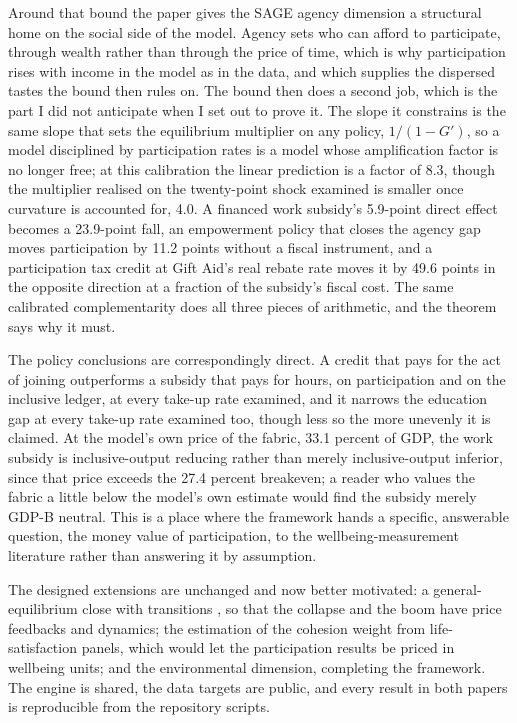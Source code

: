 \documentclass[11pt]{article}
\begin{document}
Around that bound the paper gives the SAGE agency dimension a structural home on the social side of the model. Agency sets who can afford to participate, through wealth rather than through the price of time, which is why participation rises with income in the model as in the data, and which supplies the dispersed tastes the bound then rules on. The bound then does a second job, which is the part I did not anticipate when I set out to prove it. The slope it constrains is the same slope that sets the equilibrium multiplier on any policy, $1/(1-G')$, so a model disciplined by participation rates is a model whose amplification factor is no longer free; at this calibration the linear prediction is a factor of 8.3, though the multiplier realised on the twenty-point shock examined is smaller once curvature is accounted for, 4.0. A financed work subsidy's 5.9-point direct effect becomes a 23.9-point fall, an empowerment policy that closes the agency gap moves participation by 11.2 points without a fiscal instrument, and a participation tax credit at Gift Aid's real rebate rate moves it by 49.6 points in the opposite direction at a fraction of the subsidy's fiscal cost. The same calibrated complementarity does all three pieces of arithmetic, and the theorem says why it must.

The policy conclusions are correspondingly direct. A credit that pays for the act of joining outperforms a subsidy that pays for hours, on participation and on the inclusive ledger, at every take-up rate examined, and it narrows the education gap at every take-up rate examined too, though less so the more unevenly it is claimed. At the model's own price of the fabric, 33.1 percent of GDP, the work subsidy is inclusive-output reducing rather than merely inclusive-output inferior, since that price exceeds the 27.4 percent breakeven; a reader who values the fabric a little below the model's own estimate would find the subsidy merely GDP-B neutral. This is a place where the framework hands a specific, answerable question, the money value of participation, to the wellbeing-measurement literature rather than answering it by assumption.

The designed extensions are unchanged and now better motivated: a general-equilibrium close with transitions \citep{auclert2021}, so that the collapse and the boom have price feedbacks and dynamics; the estimation of the cohesion weight from life-satisfaction panels, which would let the participation results be priced in wellbeing units; and the environmental dimension, completing the framework. The engine is shared, the data targets are public, and every result in both papers is reproducible from the repository scripts.



\end{document}
